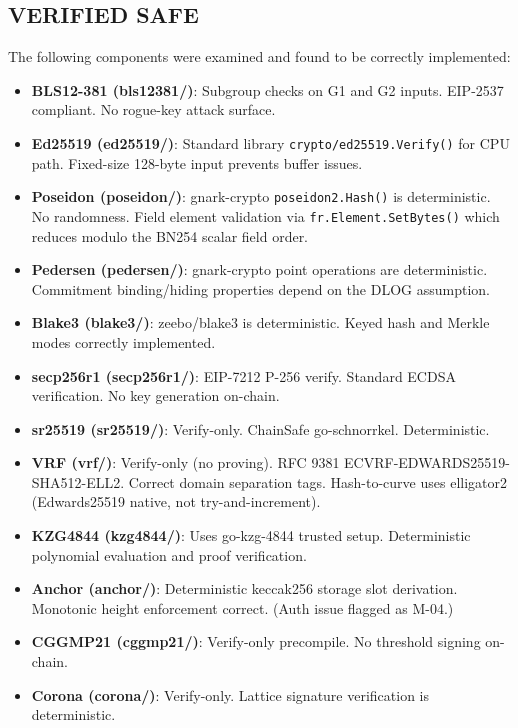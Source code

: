 \documentclass[
]{article}
\providecommand{\tightlist}{%
  \setlength{\itemsep}{0pt}\setlength{\parskip}{0pt}}
\begin{document}
\subsection{VERIFIED SAFE}\label{verified-safe}

The following components were examined and found to be correctly
implemented:

\begin{itemize}
\tightlist
\item
  \textbf{BLS12-381 (bls12381/)}: Subgroup checks on G1 and G2 inputs.
  EIP-2537 compliant. No rogue-key attack surface.
\item
  \textbf{Ed25519 (ed25519/)}: Standard library
  \texttt{crypto/ed25519.Verify()} for CPU path. Fixed-size 128-byte
  input prevents buffer issues.
\item
  \textbf{Poseidon (poseidon/)}: gnark-crypto \texttt{poseidon2.Hash()}
  is deterministic. No randomness. Field element validation via
  \texttt{fr.Element.SetBytes()} which reduces modulo the BN254 scalar
  field order.
\item
  \textbf{Pedersen (pedersen/)}: gnark-crypto point operations are
  deterministic. Commitment binding/hiding properties depend on the DLOG
  assumption.
\item
  \textbf{Blake3 (blake3/)}: zeebo/blake3 is deterministic. Keyed hash
  and Merkle modes correctly implemented.
\item
  \textbf{secp256r1 (secp256r1/)}: EIP-7212 P-256 verify. Standard ECDSA
  verification. No key generation on-chain.
\item
  \textbf{sr25519 (sr25519/)}: Verify-only. ChainSafe go-schnorrkel.
  Deterministic.
\item
  \textbf{VRF (vrf/)}: Verify-only (no proving). RFC 9381
  ECVRF-EDWARDS25519-SHA512-ELL2. Correct domain separation tags.
  Hash-to-curve uses elligator2 (Edwards25519 native, not
  try-and-increment).
\item
  \textbf{KZG4844 (kzg4844/)}: Uses go-kzg-4844 trusted setup.
  Deterministic polynomial evaluation and proof verification.
\item
  \textbf{Anchor (anchor/)}: Deterministic keccak256 storage slot
  derivation. Monotonic height enforcement correct. (Auth issue flagged
  as M-04.)
\item
  \textbf{CGGMP21 (cggmp21/)}: Verify-only precompile. No threshold
  signing on-chain.
\item
  \textbf{Corona (corona/)}: Verify-only. Lattice signature
  verification is deterministic.

\end{itemize}
\end{document}
